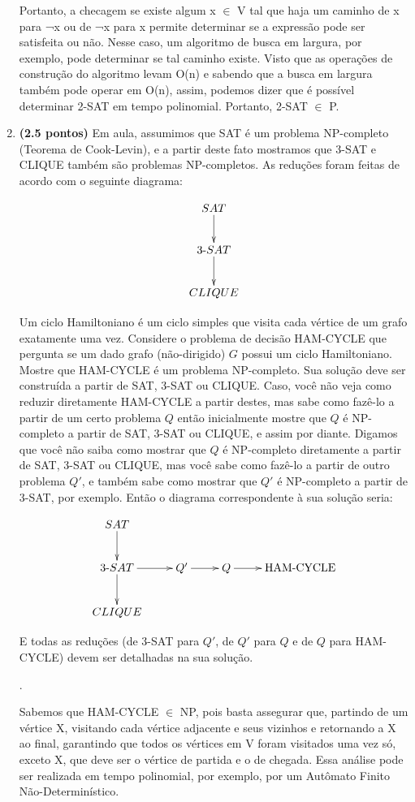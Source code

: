 \documentclass[12pt]{article}
\newcommand{\resposta}[1]{ \noindent {\bf Solução}.{\color{blue} #1}}
\begin{document}
\begin{enumerate}
{    Portanto, a checagem se existe algum x $\in$ V tal que haja um caminho de x para ¬x ou de ¬x para x permite determinar se a expressão pode ser satisfeita ou não. Nesse caso, um algoritmo de busca em largura, por exemplo, pode determinar se tal caminho existe. Visto que as operações de construção do algoritmo levam O(n) e sabendo que a busca em largura também pode operar em O(n), assim, podemos dizer que é possível determinar 2-SAT em tempo polinomial. Portanto, 2-SAT $\in$ P.
  }
  
\item {\bf (2.5 pontos)} Em aula, assumimos que SAT é um problema
  NP-completo (Teorema de Cook-Levin), e a partir deste fato mostramos
  que 3-SAT e CLIQUE também são problemas NP-completos. As reduções
  foram feitas de acordo com o seguinte diagrama:

  $$\xymatrix{
    SAT \ar[d] \\
    3\mbox{-}SAT \ar[d] \\
    CLIQUE 
  }$$
  
  Um ciclo Hamiltoniano é um ciclo simples que visita cada vértice de
  um grafo exatamente uma vez. Considere o problema de decisão
  HAM-CYCLE que pergunta se um dado grafo (não-dirigido) $G$ possui um
  ciclo Hamiltoniano. Mostre que HAM-CYCLE é um problema
  NP-completo. Sua solução deve ser construída a partir de SAT, 3-SAT
  ou CLIQUE. Caso, você não veja como reduzir diretamente HAM-CYCLE a
  partir destes, mas sabe como fazê-lo a partir de um certo problema
  $Q$ então inicialmente mostre que $Q$ é NP-completo a partir de SAT,
  3-SAT ou CLIQUE, e assim por diante. Digamos que você não saiba como
  mostrar que $Q$ é NP-completo diretamente a partir de SAT, 3-SAT ou
  CLIQUE, mas você sabe como fazê-lo a partir de outro problema $Q'$,
  e também sabe como mostrar que $Q'$ é NP-completo a partir de 3-SAT,
  por exemplo. Então o diagrama correspondente à sua solução seria:

$$\xymatrix{
  SAT \ar[d] & & & \\
  3\mbox{-}SAT \ar[d]\ar[r] & Q' \ar[r] & Q \ar[r] & \mbox{HAM-CYCLE}  \\
  CLIQUE & & & 
}$$

E todas as reduções (de 3-SAT para $Q'$, de $Q'$ para $Q$ e de $Q$ para HAM-CYCLE) devem ser detalhadas na sua solução.

\resposta{
    Sabemos que HAM-CYCLE $\in$ NP, pois basta assegurar que, partindo de um vértice X, visitando cada vértice adjacente e seus vizinhos e retornando a X ao final, garantindo que todos os vértices em V foram visitados uma vez só, exceto X, que deve ser o vértice de partida e o de chegada. Essa análise pode ser realizada em tempo polinomial, por exemplo, por um Autômato Finito Não-Determinístico.
    
}
\end{enumerate}
\end{document}

